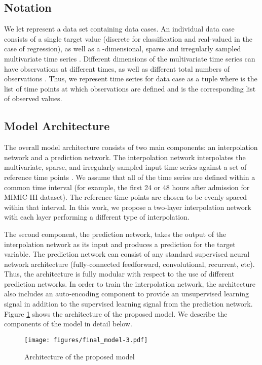 \documentclass{article} \usepackage{iclr2019_conference,times}
\begin{document}
\subsection{Notation}

We let  represent a data set containing
 data cases. An individual data case consists of
a single target value  (discrete for classification
and real-valued in the case of regression), as well as a -dimensional, sparse and irregularly
sampled multivariate time series . Different dimensions  of the multivariate
time series can have observations at different times, as well as different total
numbers of observations . Thus, we represent time series  for data case  as a tuple
  where 
is the list of time points at which observations are defined and 
 is the corresponding list of observed values.

\subsection{Model Architecture}

The overall model architecture consists of two main components: an interpolation
network and a prediction network. The interpolation network interpolates
the multivariate, sparse, and irregularly sampled input time series against 
a set of reference time points . We assume that all of the 
time series are defined within a common time interval (for example, the first 24 or 48  
hours after admission for MIMIC-III dataset). The  reference time points  are chosen to be evenly 
spaced within that interval. In this work, we propose a two-layer interpolation network with each layer performing a different type of interpolation.

The second component, the prediction network, takes the output of the interpolation
network as its input and produces a prediction  for the target variable.
The prediction network can consist of any standard supervised 
neural network architecture (fully-connected feedforward, convolutional, recurrent, etc).
Thus, the architecture is fully modular with respect to the use of different prediction
networks. In order to train the interpolation network, the architecture also includes
an auto-encoding component to provide an unsupervised learning signal in addition to
the supervised learning signal from the prediction network. Figure \ref{fig:model} shows the architecture of the proposed model. We describe the components
of the model in detail below. 

\begin{figure}[t]
\texttt{[image: figures/final\_model-3.pdf]}
\centering
\caption{Architecture of the proposed model}
\label{fig:model}
\end{figure}
\end{document}
